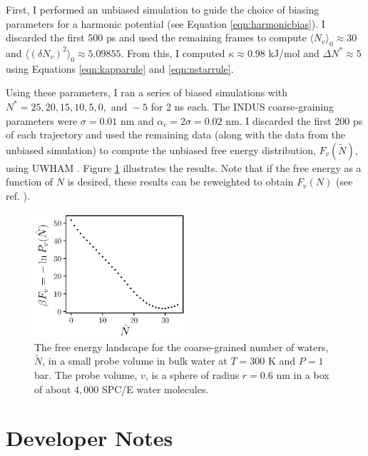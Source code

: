 \documentclass[11pt,notitlepage]{article}
\begin{document}
First, I performed an unbiased simulation to guide the choice of biasing parameters for a harmonic potential (see Equation \ref{eqn:harmonicbias}). I discarded the first 500 ps and used the remaining frames to compute $\langle N_v \rangle_0 \approx 30$ and $\langle (\delta N_v)^2 \rangle_0 \approx 5.09855$. From this, I computed $\kappa \approx 0.98$ kJ/mol and $\Delta N^* \approx 5$ using Equations \ref{eqn:kapparule} and \ref{eqn:nstarrule}. 

Using these parameters, I ran a series of biased simulations with $N^* = 25, 20, 15, 10, 5, 0, \text{ and } -5$ for 2 ns each. The INDUS coarse-graining parameters were $\sigma = 0.01$ nm and $\alpha_c = 2 \sigma = 0.02$ nm. I discarded the first 200 ps of each trajectory and used the remaining data (along with the data from the unbiased simulation) to compute the unbiased free energy distribution, $F_v( \tilde{N} )$, using UWHAM \cite{Tan2012}. Figure \ref{fig:fvn_bulk} illustrates the results. Note that if the free energy as a function of $N$ is desired, these results can be reweighted to obtain $F_v(N)$ (see ref. \cite{Patel2010}).


\begin{figure}
	\label{fig:fvn_bulk}
	\centering
	\includegraphics[width=0.5\textwidth]{examples/bulk_water/plot_F_v_Ntilde_WHAM.eps}
	\captionsetup{width=0.8\linewidth}
	\caption{\label{fig:fvn_bulk}The free energy landscape for the coarse-grained number of waters, $\tilde{N}$, in a small probe volume in bulk water at $T = 300$ K and $P = 1$ bar. The probe volume, $v$, is a sphere of radius $r = 0.6$ nm in a box of about $4,000$ SPC/E water molecules.}
\end{figure}



\section{Developer Notes}
\end{document}
